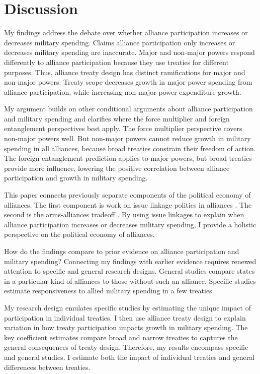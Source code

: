 \documentclass[12pt]{article}
\begin{document}
\section{Discussion}


My findings address the debate over whether alliance participation increases or decreases military spending. 
Claims alliance participation only increases or decreases military spending are inaccurate. 
Major and non-major powers respond differently to alliance participation because they use treaties for different purposes. 
Thus, alliance treaty design has distinct ramifications for major and non-major powers. 
Treaty scope decreases growth in major power spending from alliance participation, while increasing non-major power expenditure growth. 


My argument builds on other conditional arguments about alliance participation and military spending \citep{DigiuseppePoast2016} and clarifies where the force multiplier and foreign entanglement perspectives best apply. 
The force multiplier perspective covers non-major powers well. 
But non-major powers cannot reduce growth in military spending in all alliances, because broad treaties constrain their freedom of action.
The foreign entanglement prediction applies to major powers, but broad treaties provide more influence, lowering the positive correlation between alliance participation and growth in military spending. 


This paper connects previously separate components of the political economy of alliances. 
The first component is work on issue linkage politics in alliances \citep{Mattes2012, Poast2012, Poast2013, Johnson2015}.
The second is the arms-alliances tradeoff \citep{Morrow1993}. 
By using issue linkages to explain when alliance participation increases or decreases military spending, I provide a holistic perspective on the political economy of alliances.  


How do the findings compare to prior evidence on alliance participation and military spending? 
Connecting my findings with earlier evidence requires renewed attention to specific and general research designs. 
General studies compare states in a particular kind of alliances to those without such an alliance. 
Specific studies estimate responsiveness to allied military spending in a few treaties. 


My research design emulates specific studies by estimating the unique impact of participation in individual treaties. 
I then use alliance treaty design to explain variation in how treaty participation impacts growth in military spending.
The key coefficient estimates compare broad and narrow treaties to captures the general consequences of treaty design. 
Therefore, my results encompass specific and general studies. 
I estimate both the impact of individual treaties and general differences between treaties. 
\end{document}
